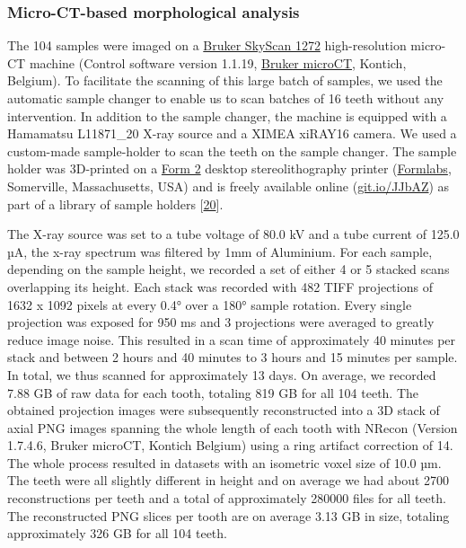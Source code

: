 \documentclass[
  american,
]{article}
\begin{document}
\hypertarget{micro-ct-based-morphological-analysis}{%
\subsubsection{Micro-CT-based morphological analysis}\label{micro-ct-based-morphological-analysis}}

The 104 samples were imaged on a \href{https://www.bruker.com/products/microtomography/micro-ct-for-sample-scanning/skyscan-1272/overview.html}{Bruker SkyScan 1272} high-resolution micro-CT machine (Control software version 1.1.19, \href{https://www.bruker.com/products/microtomography.html}{Bruker microCT}, Kontich, Belgium).
To facilitate the scanning of this large batch of samples, we used the automatic sample changer to enable us to scan batches of 16 teeth without any intervention.
In addition to the sample changer, the machine is equipped with a Hamamatsu L11871\_20 X-ray source and a XIMEA xiRAY16 camera.
We used a custom-made sample-holder to scan the teeth on the sample changer.
The sample holder was 3D-printed on a \href{https://formlabs.com/3d-printers/form-2/}{Form 2} desktop stereolithography printer (\href{https://formlabs.com/}{Formlabs}, Somerville, Massachusetts, USA) and is freely available online (\href{https://git.io/JJbAZ}{git.io/JJbAZ}) as part of a library of sample holders {[}\protect\hyperlink{ref-115PPSuQp}{20}{]}.

The X-ray source was set to a tube voltage of 80.0 kV and a tube current of 125.0 µA, the x-ray spectrum was filtered by 1mm of Aluminium.
For each sample, depending on the sample height, we recorded a set of either 4 or 5 stacked scans overlapping its height.
Each stack was recorded with 482 TIFF projections of 1632 x 1092 pixels at every 0.4° over a 180° sample rotation.
Every single projection was exposed for 950 ms and 3 projections were averaged to greatly reduce image noise.
This resulted in a scan time of approximately 40 minutes per stack and between 2 hours and 40 minutes to 3 hours and 15 minutes per sample.
In total, we thus scanned for approximately 13 days.
On average, we recorded 7.88 GB of raw data for each tooth, totaling 819 GB for all 104 teeth.
The obtained projection images were subsequently reconstructed into a 3D stack of axial PNG images spanning the whole length of each tooth with NRecon (Version 1.7.4.6, Bruker microCT, Kontich Belgium) using a ring artifact correction of 14.
The whole process resulted in datasets with an isometric voxel size of 10.0 µm.
The teeth were all slightly different in height and on average we had about 2700 reconstructions per teeth and a total of approximately 280000 files for all teeth.
The reconstructed PNG slices per tooth are on average 3.13 GB in size, totaling approximately 326 GB for all 104 teeth.
\end{document}
